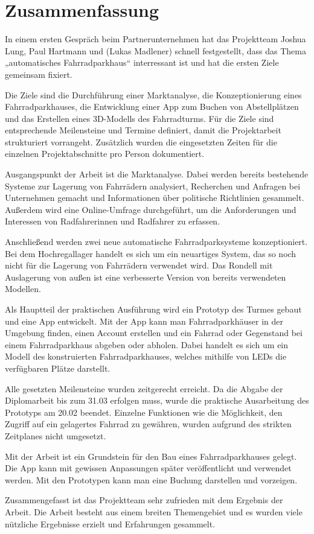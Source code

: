 \section{Zusammenfassung}

In einem ersten Gespräch beim Partnerunternehmen hat das Projektteam Joshua Lung, Paul Hartmann und (Lukas Madlener) schnell festgestellt, dass das Thema „automatisches Fahrradparkhaus“ interressant ist und hat die ersten Ziele gemeinsam fixiert.

\noindent Die Ziele sind die Durchführung einer Marktanalyse, die Konzeptionierung eines Fahrradparkhauses, die Entwicklung einer App zum Buchen von Abstellplätzen und das Erstellen eines 3D-Modells des Fahrradturms. Für die Ziele sind entsprechende Meilensteine und Termine definiert, damit die Projektarbeit strukturiert vorrangeht. Zusätzlich wurden die eingesetzten Zeiten für die einzelnen Projektabschnitte pro Person dokumentiert.

\bigskip


\noindent Ausgangspunkt der Arbeit ist die Marktanalyse. Dabei werden bereits bestehende Systeme zur Lagerung von Fahrrädern analysiert, Recherchen und Anfragen bei Unternehmen gemacht und Informationen über politische Richtlinien gesammelt. Außerdem wird eine Online-Umfrage durchgeführt, um die Anforderungen und Interessen von Radfahrerinnen und Radfahrer zu erfassen.

\noindent Anschließend werden zwei neue automatische Fahrradparksysteme konzeptioniert. Bei dem Hochregallager handelt es sich um ein neuartiges System, das so noch nicht für die Lagerung von Fahrrädern verwendet wird. Das Rondell mit Auslagerung von außen ist eine verbesserte Version von bereits verwendeten Modellen.

\noindent Als Hauptteil der praktischen Ausführung wird ein Prototyp des Turmes gebaut und eine App entwickelt. Mit der App kann man Fahrradparkhäuser in der Umgebung finden, einen Account erstellen und ein Fahrrad oder Gegenstand bei einem Fahrradparkhaus abgeben oder abholen. Dabei handelt es sich um ein Modell des konstruierten Fahrradparkhauses, welches mithilfe von LEDs die verfügbaren Plätze darstellt.

\noindent Alle gesetzten Meilensteine wurden zeitgerecht erreicht. Da die Abgabe der Diplomarbeit bis zum 31.03 erfolgen muss, wurde die praktische Ausarbeitung des Prototyps am 20.02 beendet. Einzelne Funktionen wie die Möglichkeit, den Zugriff auf ein gelagertes Fahrrad zu gewähren, wurden aufgrund des strikten Zeitplanes nicht umgesetzt.

\bigskip


\noindent Mit der Arbeit ist ein Grundstein für den Bau eines Fahrradparkhauses gelegt. Die App kann mit gewissen Anpassungen später veröffentlicht und verwendet werden. Mit den Prototypen kann man eine Buchung darstellen und vorzeigen.

\noindent Zusammengefasst ist das Projektteam sehr zufrieden mit dem Ergebnis der Arbeit. Die Arbeit besteht aus einem breiten Themengebiet und es wurden viele nützliche Ergebnisse erzielt und Erfahrungen gesammelt.
